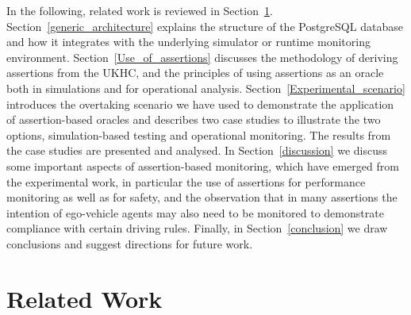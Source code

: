 In the following, 
%
related work is reviewed in Section~\ref{Related_work}.
%
Section~\ref{generic_architecture} explains the structure of the PostgreSQL database and how it integrates with the underlying simulator or runtime monitoring environment. 
%
Section~\ref{Use_of_assertions} discusses the  methodology of deriving assertions from the UKHC, and the principles of using  assertions as an oracle both in simulations and for operational analysis. 
%
Section~\ref{Experimental_scenario} introduces the overtaking scenario we have used to demonstrate the application of assertion-based oracles and describes two case studies to illustrate the two options, simulation-based testing and operational monitoring. The results from the case studies are presented and analysed. 
%
In Section~\ref{discussion} we discuss some important aspects of assertion-based monitoring, which have emerged from the experimental work, in particular the use of assertions for performance monitoring as well as for safety, and the observation that in many assertions the intention of ego-vehicle agents may also need to be monitored 
to demonstrate compliance with certain driving rules.
%
Finally, in Section~\ref{conclusion} we draw conclusions and suggest directions for future work.




\section{Related Work}
\label{Related_work}

